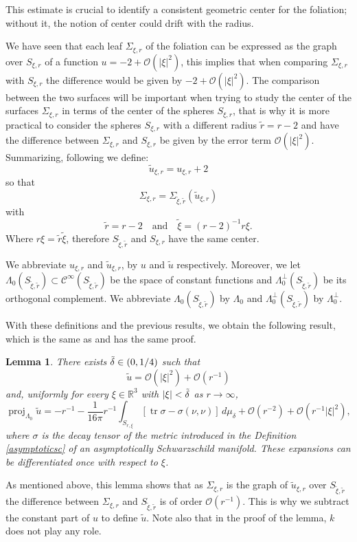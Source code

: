 \documentclass[12pt,a4paper]{amsart}
\theoremstyle{plain}
\newtheorem{lemma}[theorem]{Lemma}
\theoremstyle{definition}
\begin{document}
This estimate is crucial to identify a consistent geometric center for the foliation; without it, the notion of center could drift with the radius.



We have seen that each leaf $\Sigma_{\xi, r}$ of the foliation can be expressed as the graph over $ S_{\xi, r}$ of a function $u= -2 + \mathcal{O}(|\xi|^2)$, this implies that when comparing $\Sigma_{\xi, r}$ with $S_{\xi,r}$ the difference would be given by $-2 + \mathcal{O}(|\xi|^2) $. The comparison between the two surfaces will be important when trying to study the center of the surfaces $\Sigma_{\xi, r}$ in terms of the center of the spheres $ S_{\xi,r}$, that is why it is more practical to consider the spheres $S_{\xi,r}$ with a different radius $\tilde{r} = r - 2 $ and have the difference between $\Sigma_{\xi, r}$ and $ S_{\xi,r}$ be given by the error term $\mathcal{O}(|\xi|^2) $. Summarizing, following \cite{willcen} we define:
\[
\tilde{u}_{\xi,r} = u_{\xi,r} + 2
\]
so that
\[
\Sigma_{\xi,r} = \Sigma_{\tilde{\xi},\tilde{r}}(\tilde{u}_{\xi,r})
\]
with
\[
\tilde{r} = r - 2 \quad \text{and} \quad \tilde{\xi} = (r - 2)^{-1} r \xi.
\]
Where $r\xi = \tilde{r} \tilde{\xi} $, therefore $S_{\tilde{\xi},\tilde{r}} $ and $S_{\xi,r} $ have the same center.

We abbreviate \(u_{\xi,r}\) and \(\tilde{u}_{\xi,r}\),   by \(u\) and \(\tilde{u}\) respectively. Moreover, we let \(\Lambda_0(S_{\tilde{\xi},\tilde{r}}) \subset \mathcal{C}^\infty(S_{\tilde{\xi},\tilde{r}})\) be the space of constant functions and \(\Lambda_0^\perp(S_{\tilde{\xi},\tilde{r}})\) be its orthogonal complement. We abbreviate \(\Lambda_0(S_{\tilde{\xi},\tilde{r}})\) by \(\Lambda_0\) and \(\Lambda_0^\perp(S_{\tilde{\xi},\tilde{r}})\) by \(\Lambda_0^\perp\).


 With these definitions and the previous results, we obtain the following result, which is the same as  \cite[Lemma 13]{willcen} and has the same proof. 
\begin{lemma}\label{decayutil}
    There exists \(\Tilde{\delta} \in (0, 1/4)\) such that
\[
\tilde{u} = \mathcal{O} (|\xi|^2) +  \mathcal{O}(r^{-1})
\]
and, uniformly for every \(\xi \in \mathbb{R}^3\) with \(|\xi| < \Tilde{\delta}\) as \(r \to \infty\),
\[
\operatorname{proj}_{\Lambda_0} \tilde{u} = -r^{-1} - \frac{1}{16\pi} r^{-1} \int_{S_{r, \xi}} [\operatorname{tr} \sigma - \sigma(\nu, \nu)] \, d\mu_{\delta} + \mathcal{O} (r^{-2}) + \mathcal{O}(r^{-1} |\xi|^2),
\]
where $\sigma $ is the decay tensor of the metric introduced in the Definition \ref{asymptoticsc} of an asymptotically Schwarzschild manifold. These expansions can be differentiated once with respect to \(\xi\).
\end{lemma}
As mentioned above, this lemma shows that as $\Sigma_{\xi,r}$ is the graph of $\tilde{u}_{\xi,r}$ over $S_{\tilde{\xi},\tilde{r}} $ the difference between  $\Sigma_{\xi,r}$   and $S_{\tilde{\xi},\tilde{r}} $ is of order $\mathcal{O}(r^{-1})$. This is why we subtract the constant part of $u $ to define $\tilde{u}$. Note also that in the proof of the lemma, $k$ does not play any role.
\end{document}
